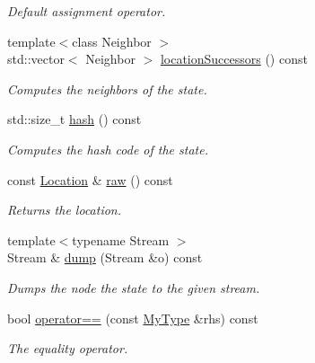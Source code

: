 \begin{DoxyCompactItemize}
\begin{DoxyCompactList}\small\item\em Default assignment operator. \end{DoxyCompactList}\item 
{\footnotesize template$<$class Neighbor $>$ }\\std\+::vector$<$ Neighbor $>$ \hyperlink{structExplicitState_a66768c0250ed5bf30158700e112e3d3d}{location\+Successors} () const 
\begin{DoxyCompactList}\small\item\em Computes the neighbors of the state. \end{DoxyCompactList}\item 
std\+::size\+\_\+t \hyperlink{structExplicitState_acebf7594a287d9181419aba3769c3d2a}{hash} () const 
\begin{DoxyCompactList}\small\item\em Computes the hash code of the state. \end{DoxyCompactList}\item 
const \hyperlink{structExplicitState_a3801fbf90c7e687071c21a05de368748}{Location} \& \hyperlink{structExplicitState_a9ee4c52d2bbc6ee39d3fbcbbda0262ce}{raw} () const 
\begin{DoxyCompactList}\small\item\em Returns the location. \end{DoxyCompactList}\item 
{\footnotesize template$<$typename Stream $>$ }\\Stream \& \hyperlink{structExplicitState_a50aaf2bbed31a6924b9c3ec17dc6938d}{dump} (Stream \&o) const 
\begin{DoxyCompactList}\small\item\em Dumps the node the state to the given stream. \end{DoxyCompactList}\item 
bool \hyperlink{structExplicitState_a86386b780ef52458fe782775ed3d37a3}{operator==} (const \hyperlink{structExplicitState_af241851bd63508f24157e7a0a71c924a}{My\+Type} \&rhs) const 
\begin{DoxyCompactList}\small\item\em The equality operator. \end{DoxyCompactList}\end{DoxyCompactItemize}
